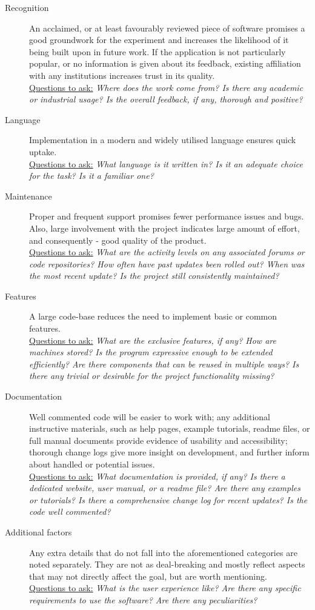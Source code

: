 \documentclass[12pt]{article}
\begin{document}
				\begin{description}
					\item[Recognition] An acclaimed, or at least favourably reviewed piece of software promises a good groundwork for the experiment and increases the likelihood of it being built upon in future work. If the application is not particularly popular, or no information is given about its feedback, existing affiliation with any institutions increases trust in its quality.\\
					\underline{Questions to ask:} \textit{Where does the work come from? Is there any academic or industrial usage? Is the overall feedback, if any, thorough and positive?}
					\item[Language] Implementation in a modern and widely utilised language ensures quick uptake.\\
					\underline{Questions to ask:} \textit{What language is it written in? Is it an adequate choice for the task? Is it a familiar one? }
					\item[Maintenance] Proper and frequent support promises fewer performance issues and bugs. Also, large involvement with the project indicates large amount of effort, and consequently - good quality of the product.\\
					\underline{Questions to ask:} \textit{What are the activity levels on any associated forums or code repositories? How often have past updates been rolled out? When was the most recent update? Is the project still consistently maintained?}
					\item[Features] A large code-base reduces the need to implement basic or common features.\\
					\underline{Questions to ask:} \textit{What are the exclusive features, if any? How are machines stored? Is the program expressive enough to be extended efficiently? Are there components that can be reused in multiple ways? Is there any trivial or desirable for the project functionality missing?}
					\item[Documentation] Well commented code will be easier to work with; any additional instructive materials, such as help pages, example tutorials, readme files, or full manual documents provide evidence of usability and accessibility; thorough change logs give more insight on development, and further inform about handled or potential issues.\\
					\underline{Questions to ask:} \textit{What documentation is provided, if any? Is there a dedicated website, user manual, or a readme file? Are there any examples or tutorials? Is there a comprehensive change log for recent updates? Is the code well commented?}
					\item[Additional factors] Any extra details that do not fall into the aforementioned categories are noted separately. They are not as deal-breaking and mostly reflect aspects that may not directly affect the goal, but are worth mentioning. \\
					\underline{Questions to ask:} \textit{What is the user experience like? Are there any specific requirements to use the software? Are there any peculiarities?}
				\end{description}
\end{document}

